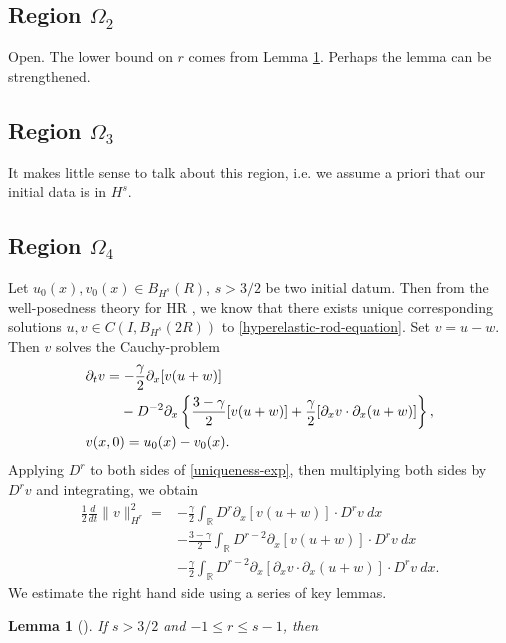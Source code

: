\documentclass[a0,portrait]{a0poster}
\newtheorem{lemma}[theorem]{Lemma}
\newcommand{\rr}{\mathbb{R}}
\newcommand{\p}{\partial}
\begin{document}
\begin{multicols}{3}
\subsection*{Region $\Omega_{2}$} 
\label{ssec:reg-6}
Open. The lower bound on $r$ comes from Lemma \ref{cor1}. Perhaps the lemma can
be strengthened.
\subsection*{Region $\Omega_{3}$} 
\label{ssec:reg-7}
It makes little sense to talk about this region, 
i.e. we assume a priori that our initial
data is in $H^{s}$. 
%
\subsection*{Region $\Omega_{4}$} 
\label{ssec:reg-m-imp}
%
%
Let $u_{0}(x), v_{0}(x)
\in B_{H^{s}}(R)$, $s > 3/2$ be two initial datum. Then from
the well-posedness theory for HR \cite{Karapetyan:2010fk}, we
know that there exists unique corresponding solutions $u, v \in C(I,
B_{H^{s}}(2R))$ to \eqref{hyperelastic-rod-equation}.
Set $v=u-w$. Then $v$ solves the Cauchy-problem
%
%
\begin{align}
	\label{uniqueness-exp}
& \p_t v
=  -\frac{\gamma}{2} \p_x [v(u + w)] 
\\
\notag
& \phantom{\p_t v = }- D^{-2} \p_x \left\{
\frac{3-\gamma}{2}[v(u+w)] + \frac{\gamma}{2}[\p_x v \cdot \p_x (u+w)]
\right\},
\\
& v(x,0) = u_{0}(x) - v_{0}(x).
\label{uniqueness-init-data}
\end{align}
%
%
%
%
Applying $D^r$ to both sides of \eqref{uniqueness-exp}, then 
multiplying both sides by $D^r v$ and integrating, we obtain
%
%
\begin{equation*}
\begin{split}
 \frac{1}{2} \frac{d}{dt} \|v\|_{H^r}^2
 = & -\frac{\gamma}{2} \int_{\rr} D^r \p_x [v(u+w)] \cdot
D^r v \ dx
\\
& - \frac{3-\gamma}{2} \int_{\rr}  D^{r -2}
\p_x[v(u+w)] \cdot
D^r v \ dx  
\\
& - \frac{\gamma}{2} \int_{\rr} D^{r 
-2} \p_x [ \p_x v
\cdot \p_x (u+w)]\cdot D^r v \ dx .
\end{split}
\end{equation*}
%
%
We estimate the right hand side using a series of key lemmas.
%
\begin{lemma}[\cite{Himonas_2009_Non-uniform-dep-per}]
\label{cor1}
If $s > 3/2$ and $-1 \le r  \le s -1$, then
%
%
\begin{equation*}

\end{equation*}
\end{lemma}
\end{multicols}
\end{document}
